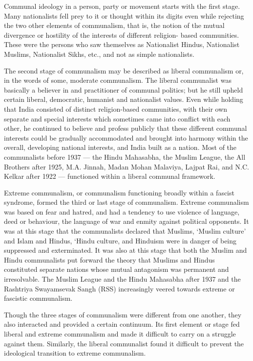 \begin{multicols}{2}
Communal ideology in a person, party or movement starts with the first stage. Many nationalists fell prey to it or thought within its digits even while rejecting the two other elements of communalism, that is, the notion of the mutual divergence or hostility of the interests of different religion- based communities. These were the persons who saw themselves as Nationalist Hindus, Nationalist Muslims, Nationalist Sikhs, etc., and not as simple nationalists. 

The second stage of communalism may be described as liberal communalism or, in the words of some, moderate communalism. The liberal communalist was basically a believer in and practitioner of communal politics; but he still upheld certain liberal, democratic, humanist and nationalist values. Even while holding that India consisted of distinct religion-based communities, with their own separate and special interests which sometimes came into conflict with each other, he continued to believe and profess publicly that these different communal interests could be gradually accommodated and brought into harmony within the overall, developing national interests, and India built as a nation. Most of the communalists before 1937 --- the Hindu Mahasabha, the Muslim League, the All Brothers after 1925, M.A. Jinnah, Madan Mohan Malaviya, Lajpat Rai, and N.C. Kelkar after 1922 --- functioned within a liberal communal framework. 

Extreme communalism, or communalism functioning broadly within a fascist syndrome, formed the third or last stage of communalism. Extreme communalism was based on fear and hatred, and had a tendency to use violence of language, deed or behaviour, the language of war and enmity against political opponents. It was at this stage that the communalists declared that Muslims, `Muslim culture' and Islam and Hindus, `Hindu culture, and Hinduism were in danger of being suppressed and exterminated. It was also at this stage that both the Muslim and Hindu communalists put forward the theory that Muslims and Hindus constituted separate nations whose mutual antagonism was permanent and irresolvable. The Muslim League and the Hindu Mahasabha after 1937 and the Rashtriya Swayamsevak Sangh (RSS) increasingly veered towards extreme or fascistic communalism. 

Though the three stages of communalism were different from one another, they also interacted and provided a certain continuum. Its first element or stage fed liberal and extreme communalism and made it difficult to carry on a struggle against them. Similarly, the liberal communalist found it difficult to prevent the ideological transition to extreme communalism. 


\end{multicols}
